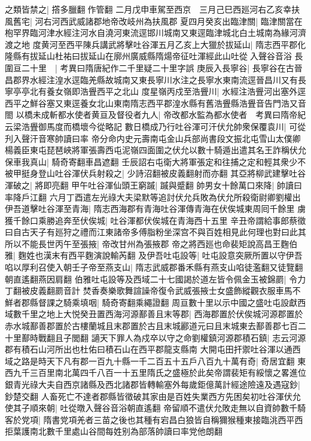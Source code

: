 之類皆禁之|{
	撘多臘翻作管翻}
二月戊申車駕至西京　三月己巳西廵河右乙亥幸扶風舊宅|{
	河右河西武威諸郡地帝改岐州為扶風郡}
夏四月癸亥出臨津關|{
	臨津關當在枹罕界臨河津水經注河水自澆河東流逕邯川城南又東逕臨津城北白土城南為緣河濟渡之地}
度黄河至西平陳兵講武將擊吐谷渾五月乙亥上大獵於拔延山|{
	隋志西平郡化隆縣有拔延山杜祐曰拔延山在廓州廣威縣隋煬帝征吐渾經此山吐從入聲谷音浴}
長圍亘二十里　|{
	考異曰隋唐紀作二千里疑二十里字誤}
庚辰入長寧谷|{
	長寧谷在古晉昌郡界水經注湟水逕臨羌縣故城南又東長寧川水注之長寧水東南流逕晉昌川又有長寧亭亭北有養女嶺即浩舋西平之北山}
度星嶺丙戍至浩舋川|{
	水經注浩舋河出塞外逕西平之鮮谷塞又東逕養女北山東南隋志西平郡湟水縣有舊浩舋縣浩舋音告門浩又音閤}
以橋未成斬都水使者黄亘及督役者九人|{
	帝改都水監為都水使者　考異曰隋帝紀云梁浩舋御馬度而橋壞今從略記}
數日橋成乃行吐谷渾可汗伏允帥衆保覆袁川|{
	可從刋入聲汗音寒帥讀曰率}
帝分命内史元壽南屯金山兵部尚書段文振北屯雪山太僕卿楊義臣東屯琵琶峽將軍張壽西屯泥嶺四面圍之伏允以數十騎遁出遣其名王詐稱伏允保車我真山|{
	騎奇寄翻車昌遮翻}
壬辰詔右屯衛大將軍張定和往捕之定和輕其衆少不被甲挺身登山吐谷渾伏兵射殺之|{
	少詩沼翻被皮義翻射而亦翻}
其亞將柳武建擊吐谷渾破之|{
	將即亮翻}
甲午吐谷渾仙頭王窮䠞|{
	䠞與蹙翻}
帥男女十餘萬口來降|{
	帥讀曰率降戶江翻}
六月丁酉遣左光祿大夫梁默等追討伏允兵敗為伏允所殺衛尉卿劉權出伊吾道擊吐谷渾至青海|{
	隋志西海郡有青海吐谷渾傳青海在伏俟城東周囘千餘里}
虜獲千餘口乘勝追奔至伏俟城|{
	吐谷渾都伏俟城在青海西十五里}
辛丑帝謂給事郎蔡徵曰自古天子有廵狩之禮而江東諸帝多傅脂粉坐深宫不與百姓相見此何理也對曰此其所以不能長世丙午至張掖|{
	帝改甘州為張掖郡}
帝之將西廵也命裴矩說高昌王麴伯雅|{
	麴姓也漢末有西平麴演說輸芮翻}
及伊吾吐屯設等|{
	吐屯設意突厥所置以守伊吾}
啗以厚利召使入朝壬子帝至燕支山|{
	隋志武威郡番禾縣有燕支山啗徒濫翻又徒覽翻朝直遙翻燕因肩翻}
伯雅吐屯設等及西域二十七國謁於道左皆令佩金玉被錦罽|{
	令力丁翻被皮義翻罽音計}
焚香奏樂歌舞諠譟帝復令武威張掖士女盛飾縱觀衣服車馬不鮮者郡縣督課之騎乘填咽|{
	騎奇寄翻乘繩證翻}
周亘數十里以示中國之盛吐屯設獻西域數千里之地上大悦癸丑置西海河源鄯善且末等郡|{
	西海郡置於伏俟城河源郡置於赤水城鄯善郡置於古樓蘭城且末郡置於古且末城酈道元曰且末城東去鄯善郡七百二十里鄯時戰翻且子閭翻}
讁天下罪人為戍卒以守之命劉權鎮河源郡積石鎮|{
	志云河源郡有積石山河所出也杜佑曰積石山在西平郡龍支縣南}
大開屯田扞禦吐谷渾以通西域之路是時天下凡有郡一百九十縣一千二百五十五戶八百九十萬有奇|{
	奇居宜翻}
東西九千三百里南北萬四千八百一十五里隋氏之盛極於此矣帝謂裴矩有綏懷之畧進位銀青光祿大夫自西京諸縣及西北諸郡皆轉輸塞外每歲鉅億萬計經途險遠及遇寇鈔|{
	鈔楚交翻}
人畜死亡不達者郡縣皆徵破其家由是百姓失業西方先困矣初吐谷渾伏允使其子順來朝|{
	吐從暾入聲谷音浴朝直遙翻}
帝留順不遣伏允敗走無以自資帥數千騎客於党項|{
	隋書党項羌者三苗之後也其種有宕昌白狼皆自稱獮猴種東接臨洮西平西拒葉護南北數千里處山谷間每姓别為部落帥讀曰率党他朗翻}
